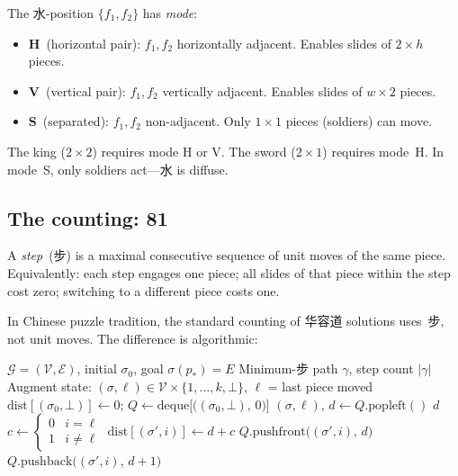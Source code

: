 \begin{definition}\label{def:free-modes}
The 水-position $\{f_1, f_2\}$ has \emph{mode}:
\begin{itemize}
  \item \textbf{H}~(horizontal pair): $f_1, f_2$
  horizontally adjacent.
  Enables slides of $2 \times h$ pieces.
  \item \textbf{V}~(vertical pair): $f_1, f_2$
  vertically adjacent.
  Enables slides of $w \times 2$ pieces.
  \item \textbf{S}~(separated): $f_1, f_2$ non-adjacent.
  Only $1 \times 1$ pieces (soldiers) can move.
\end{itemize}
The king ($2 \times 2$) requires mode H or V\@.
The sword ($2 \times 1$) requires mode~H\@.
In mode~S, only soldiers act---水 is diffuse.
\end{definition}

\subsection*{The counting: 81}

\begin{definition}[步 (step)]\label{def:bu}
A \emph{step}~(步) is a maximal consecutive sequence of
unit moves of the same piece.
Equivalently: each step engages one piece;
all slides of that piece within the step cost zero;
switching to a different piece costs one.
\end{definition}

In Chinese puzzle tradition, the standard counting of
华容道 solutions uses~步, not unit moves.
The difference is algorithmic:

\begin{algorithm}[H]
\caption{Minimum-步 solver
  (0/1~BFS on $\mathcal{G}$)}\label{alg:kpc}
\begin{algorithmic}[1]
\Require $\mathcal{G} = (\mathcal{V}, \mathcal{E})$,\;
  initial $\sigma_0$,\;
  goal $\sigma(p_*) = E$
\Ensure Minimum-步 path $\gamma$,\;
  step count $|\gamma|$
\Statex
\State Augment state:
  $(\sigma, \ell) \in
  \mathcal{V} \times \{1, \ldots, k, \bot\}$,
  $\ell$ = last piece moved
\State $\mathrm{dist}[(\sigma_0, \bot)] \gets 0$;\;
  $Q \gets \mathrm{deque}
  \bigl[\bigl((\sigma_0, \bot),\, 0\bigr)\bigr]$
  \State $(\sigma, \ell),\, d \gets Q.\mathrm{popleft}()$
    \Return $d$ 
  \EndIf
    \State $c \gets
      \begin{cases}
      0 & i = \ell \\
      1 & i \neq \ell
      \end{cases}$
      \State $\mathrm{dist}[(\sigma', i)] \gets d + c$
      \;
        $Q.\mathrm{pushfront}
        \bigl((\sigma', i),\, d\bigr)$
      \Else\;
        $Q.\mathrm{pushback}
        \bigl((\sigma', i),\, d + 1\bigr)$
      \EndIf
    \EndIf
  \EndFor
\EndWhile
\end{algorithmic}
\end{algorithm}

